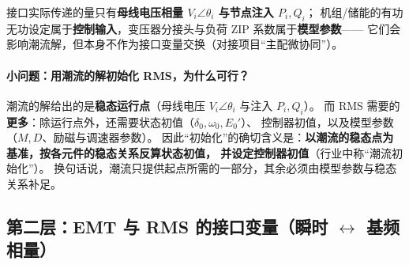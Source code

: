 接口实际传递的量只有\textbf{母线电压相量 $V_i\angle\theta_i$ 与节点注入 $P_i,Q_i$}；
机组/储能的有功无功设定属于\textbf{控制输入}，变压器分接头与负荷 ZIP 系数属于\textbf{模型参数}——
它们会影响潮流解，但本身不作为接口变量交换（对接项目“主配微协同”\cite{ndrc2024}）。

\paragraph{小问题：用潮流的解初始化 RMS，为什么可行？}
潮流的解给出的是\textbf{稳态运行点}（母线电压 $V_i\angle\theta_i$ 与注入 $P_i,Q_i$）。
而 RMS 需要的\textbf{更多}：除运行点外，还需要状态初值（$\delta_0,\omega_0,E_0'$）、
控制器初值，以及模型参数（$M,D$、励磁与调速器参数）。
因此“初始化”的确切含义是：\textbf{以潮流的稳态点为基准，按各元件的稳态关系反算状态初值，
并设定控制器初值}（行业中称“潮流初始化”）。
换句话说，潮流只提供起点所需的一部分，其余必须由模型参数与稳态关系补足。

\subsection{第二层：EMT 与 RMS 的接口变量（瞬时 $\leftrightarrow$ 基频相量）}
\label{sec:phasor-link}

